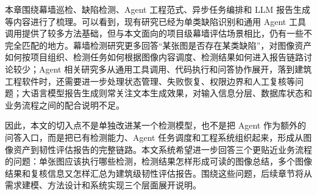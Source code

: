 本章围绕幕墙巡检、缺陷检测、Agent 工程范式、异步任务编排和 LLM 报告生成等内容进行了梳理。可以看到，现有研究已经为单类缺陷识别和通用 Agent 工具调用提供了较多方法基础，但与本文面向的项目级幕墙评估场景相比，仍有一些不完全匹配的地方。幕墙检测研究更多回答“某张图是否存在某类缺陷”，对图像资产如何按项目组织、检测任务如何根据图像内容调度、检测结果如何进入报告链路讨论较少；Agent 相关研究多从通用工具调用、代码执行和问答协作展开，落到建筑工程软件时，还需要进一步处理状态管理、失败恢复、权限边界和人工复核等问题；大语言模型报告生成则常关注文本生成效果，对输入信息分层、数据库状态和业务流程之间的配合说明不足。

因此，本文的切入点不是单独改进某一个检测模型，也不是把 Agent 作为额外的问答入口，而是把已有检测能力、Agent 任务调度和工程系统组织起来，形成从图像资产到韧性评估报告的完整链路。本文系统希望进一步回答三个更贴近业务流程的问题：单张图应该执行哪些检测，检测结果怎样形成可读的图像总结，多个图像结果和复核信息又怎样汇总为建筑级韧性评估报告。围绕这些问题，后续章节将从需求建模、方法设计和系统实现三个层面展开说明。

